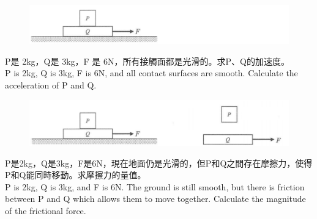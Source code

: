 \documentclass[beamer=true]{standalone}
\begin{document}
\begin{eg}
    \begin{figure}[h!]
        \centering
        \includegraphics[width=.8\textwidth]{assets/9c913c73.png}
    \end{figure}
    P是 2kg，Q是 3kg，F 是 6N，所有接觸面都是光滑的。求P、Q的加速度。\\P is 2kg, Q is 3kg, F is 6N, and all contact surfaces are smooth.  Calculate the acceleration of P and Q.
\end{eg}

\begin{eg}
    \begin{figure}[h!]
        \centering
        \includegraphics[width=.8\textwidth]{assets/5c3215d2.png}
    \end{figure}
    P是2kg，Q是3kg，F是6N，現在地面仍是光滑的，但P和Q之間存在摩擦力，使得P和Q能同時移動。求摩擦力的量值。\\P is 2kg, Q is 3kg, and F is 6N. The ground is still smooth, but there is friction between P and Q which allows them to move together. Calculate the magnitude of the frictional force.
\end{eg}
\end{document}
